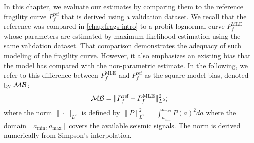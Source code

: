 In this chapter, we evaluate our estimates by comparing them to the reference fragility curve $P^{\text{ref}}_f$ that is derived using a validation dataset. %
We recall that the reference was compared in \cref{chap:frags-intro} to a probit-lognormal curve $P^{\text{MLE}}_f$ whose parameters are estimated by maximum likelihood estimation using the same validation dataset.
That comparison demonstrates the adequacy of such modeling of the fragility curve. However, it also emphasizes an existing bias that the model has compared with the non-parametric estimate. In the following, we refer to this difference between $P_f^{\text{MLE}}$ and $P_f^{\text{ref}}$ as the square model bias, denoted by $\mathcal{M}\mathcal{B}$:
\begin{equation}
    \mathcal{M}\mathcal{B} = \|P^{\text{ref}}_f - P^{\text{MLE}}_f  \|_{L^2}^2;
\end{equation}
where the norm $\|\cdot \|_{L^2}$ is defined by $\|P\|_{L^2}^2=\int_{a_{\min}}^{a_{\max}} P(a)^2da$ where the domain $[a_{\min},a_{\max}]
$ covers the available seismic signals. The norm is derived numerically from Simpson's interpolation. %




